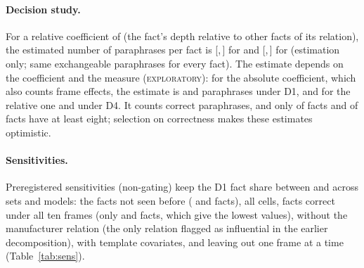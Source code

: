 \documentclass[11pt]{article}
\newcommand{\expl}{\textsc{exploratory}\xspace}
\newcommand{\ci}[2]{[#1,\,#2]} %
\newcommand{\olmo}{\OlmoTwoSevenB}
\newcommand{\llama}{\LlamaThreeOneEightB}
\newcommand{\STwo}{Study~2\xspace} %
\begin{document}
\paragraph{Decision study.}
For a relative coefficient of \ptRuleG{} (the fact's depth relative to other facts of its relation), the estimated number of paraphrases per fact is \ptNprimeLlama{} \ci{\ptNprimeLoLlama}{\ptNprimeHiLlama} for \llama{} and \ptNprimeOlmo{} \ci{\ptNprimeLoOlmo}{\ptNprimeHiOlmo} for \olmo{} (estimation only; same exchangeable paraphrases for every fact).
The estimate depends on the coefficient and the measure (\expl): for the absolute coefficient, which also counts frame effects, the estimate is \explNprimePhiDOneLlama{} and \explNprimePhiDOneOlmo{} paraphrases under D1, and for the relative one \explNprimeGDFourLlama{} and \explNprimeGDFourOlmo{} under D4.
It counts correct paraphrases, and only \explFactsGeEightLlama{} of \ptNFactsLlama{} \llama{} facts and \explFactsGeEightOlmo{} of \ptNFactsOlmo{} \olmo{} facts have at least eight; selection on correctness makes these estimates optimistic.

\begin{table}[t]
\centering\small
\setlength{\tabcolsep}{4pt} %

\caption{Preregistered \STwo sensitivities (D1; non-gating). lo: lower bound of the difference interval. Leave one frame out: range of point estimates over the ten frames.}
\label{tab:sens}
\end{table}

\paragraph{Sensitivities.}
Preregistered sensitivities (non-gating) keep the D1 fact share between \ptSensIccDOneMin{} and \ptSensIccDOneMax{} across sets and models: the facts not seen before (\ptSensNewNFactsLlama{} and \ptSensNewNFactsOlmo{} facts), all cells, facts correct under all ten frames (only \ptSensAllTenNFactsLlama{} and \ptSensAllTenNFactsOlmo{} facts, which give the lowest values), without the manufacturer relation (the only relation flagged as influential in the earlier decomposition), with template covariates, and leaving out one frame at a time (Table~\ref{tab:sens}).
\end{document}

